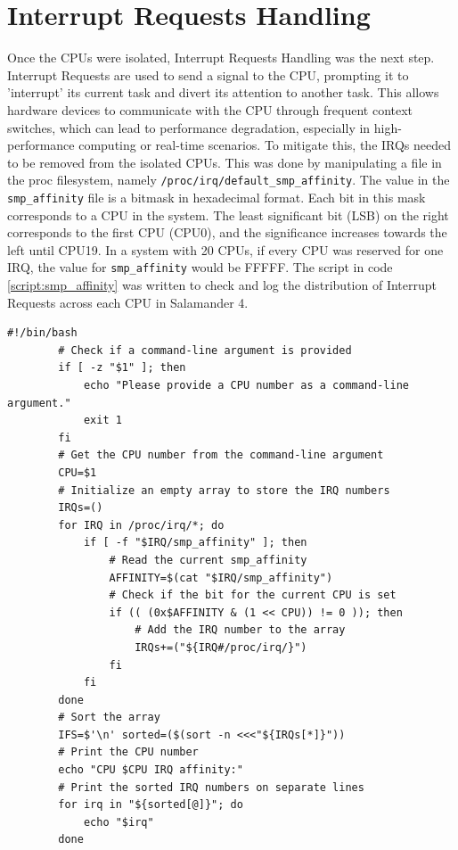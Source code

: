 \documentclass[MMR,Master,english]{twbook}
\begin{document}
\clearpage
\section{Interrupt Requests Handling}\label{sec:irq_handling}
Once the CPUs were isolated, Interrupt Requests Handling was the next step. Interrupt Requests are used to send a signal to the CPU, prompting it to 'interrupt' its current task and divert its attention to another task. This allows hardware devices to communicate with the CPU through frequent context switches, which can lead to performance degradation, especially in high-performance computing or real-time scenarios. To mitigate this, the IRQs needed to be removed from the isolated CPUs. This was done by manipulating a file in the proc filesystem, namely \texttt{/proc/irq/default\_smp\_affinity}. The value in the \texttt{smp\_affinity} file is a bitmask in hexadecimal format. Each bit in this mask corresponds to a CPU in the system. The least significant bit (LSB) on the right corresponds to the first CPU (CPU0), and the significance increases towards the left until CPU19. In a system with 20 CPUs, if every CPU was reserved for one IRQ, the value for \texttt{smp\_affinity} would be FFFFF. The script in code \ref{script:smp_affinity} was written to check and log the distribution of Interrupt Requests across each CPU in Salamander 4.

\vspace{1em}
\begin{minipage}{0.95\columnwidth}
	\begin{lstlisting}[name={Check distribution of Interrupt Requests across each CPU},label={script:smp_affinity}]
		#!/bin/bash
		# Check if a command-line argument is provided
		if [ -z "$1" ]; then
			echo "Please provide a CPU number as a command-line argument."
			exit 1
		fi
		# Get the CPU number from the command-line argument
		CPU=$1
		# Initialize an empty array to store the IRQ numbers
		IRQs=()
		for IRQ in /proc/irq/*; do
			if [ -f "$IRQ/smp_affinity" ]; then
				# Read the current smp_affinity
				AFFINITY=$(cat "$IRQ/smp_affinity")
				# Check if the bit for the current CPU is set
				if (( (0x$AFFINITY & (1 << CPU)) != 0 )); then
					# Add the IRQ number to the array
					IRQs+=("${IRQ#/proc/irq/}")
				fi
			fi
		done
		# Sort the array
		IFS=$'\n' sorted=($(sort -n <<<"${IRQs[*]}"))
		# Print the CPU number
		echo "CPU $CPU IRQ affinity:"
		# Print the sorted IRQ numbers on separate lines
		for irq in "${sorted[@]}"; do
			echo "$irq"
		done
		
\end{lstlisting}
\end{minipage}
\end{document}
